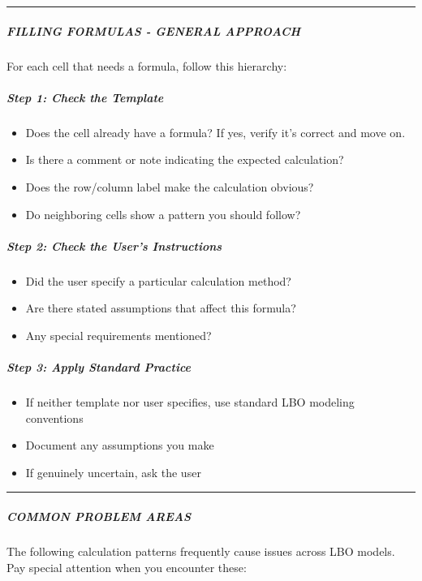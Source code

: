 \documentclass[11pt]{article}
\begin{document}
\vspace{0.5em}\hrule\vspace{0.5em}

\subparagraph{FILLING FORMULAS - GENERAL APPROACH}\mbox{}\par

For each cell that needs a formula, follow this hierarchy:


\subparagraph{Step 1: Check the Template}\mbox{}\par
\begin{itemize}[leftmargin=*,itemsep=2pt,topsep=2pt]
\item {} Does the cell already have a formula? If yes, verify it's correct and move on.
\item {} Is there a comment or note indicating the expected calculation?
\item {} Does the row/column label make the calculation obvious?
\item {} Do neighboring cells show a pattern you should follow?
\end{itemize}

\subparagraph{Step 2: Check the User's Instructions}\mbox{}\par
\begin{itemize}[leftmargin=*,itemsep=2pt,topsep=2pt]
\item {} Did the user specify a particular calculation method?
\item {} Are there stated assumptions that affect this formula?
\item {} Any special requirements mentioned?
\end{itemize}

\subparagraph{Step 3: Apply Standard Practice}\mbox{}\par
\begin{itemize}[leftmargin=*,itemsep=2pt,topsep=2pt]
\item {} If neither template nor user specifies, use standard LBO modeling conventions
\item {} Document any assumptions you make
\item {} If genuinely uncertain, ask the user
\end{itemize}

\vspace{0.5em}\hrule\vspace{0.5em}

\subparagraph{COMMON PROBLEM AREAS}\mbox{}\par

The following calculation patterns frequently cause issues across LBO models. Pay special attention when you encounter these:
\end{document}
